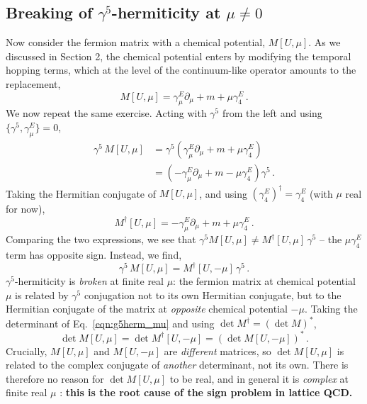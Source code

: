 \documentclass[11pt]{article}
\theoremstyle{definition}
\begin{document}
\subsection*{Breaking of $\gamma^5$-hermiticity at $\mu \neq 0$}
Now consider the fermion matrix with a chemical potential, $M[U, \mu]$. As we discussed in Section 2, the chemical potential enters by modifying the temporal hopping terms, which at the level of the continuum-like operator amounts to the replacement,
\begin{equation}
    M[U,\mu] = \gamma^E_\mu \partial_\mu + m + \mu \gamma^E_4 \,.
\end{equation}
We now repeat the same exercise. Acting with $\gamma^5$ from the left and using $\{\gamma^5, \gamma^E_\mu\} = 0$,
\begin{align}
\gamma^5 \, M[U, \mu] &= \gamma^5 \left(\gamma^E_\mu \partial_\mu + m + \mu\gamma^E_4\right) \nonumber \\
&= \left(-\gamma^E_\mu \partial_\mu + m - \mu\gamma^E_4\right)\gamma^5 \,.
\end{align}
Taking the Hermitian conjugate of $M[U,\mu]$, and using $(\gamma^E_4)^\dagger = \gamma^E_4$ (with $\mu$ real for now),
\begin{equation}
    M^\dagger[U, \mu] = -\gamma^E_\mu \partial_\mu + m + \mu\gamma^E_4 \,.
\end{equation}
Comparing the two expressions, we see that $\gamma^5 M[U, \mu] \neq M^\dagger[U,\mu]\,\gamma^5$ -- the $\mu\gamma^E_4$ term has opposite sign. Instead, we find,
\begin{equation}\label{eqn:g5herm_mu}
\gamma^5 \, M[U, \mu] = M^\dagger[U, -\mu] \, \gamma^5 \,.
\end{equation}
$\gamma^5$-hermiticity is \textit{broken} at finite real $\mu$: the fermion matrix at chemical potential $\mu$ is related by $\gamma^5$ conjugation not to its own Hermitian conjugate, but to the Hermitian conjugate of the matrix at \textit{opposite} chemical potential $-\mu$. Taking the determinant of Eq.~\eqref{eqn:g5herm_mu} and using $\det M^\dagger = (\det M)^*$,
\begin{equation}\label{eqn:det_relation_real}
    \det M[U, \mu] = \det M^\dagger[U, -\mu] = \left(\det M[U, -\mu]\right)^* \,.
\end{equation}
Crucially, $M[U,\mu]$ and $M[U,-\mu]$ are \emph{different} matrices, so $\det M[U,\mu]$ is related to the complex conjugate of \emph{another} determinant, not its own. There is therefore no reason for $\det M[U,\mu]$ to be real, and in general it is \textit{complex} at finite real $\mu$ : \textbf{this is the root cause of the sign problem in lattice QCD.}
\end{document}
